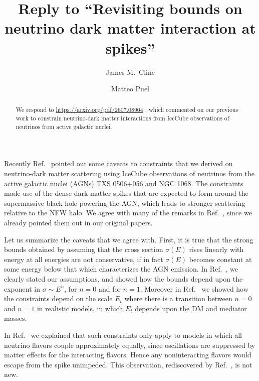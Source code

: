 \documentclass[twocolumn,prd,nofootinbib,aps,prl,floats,floatfix,amsmath,amssymb,longbibliography,secnumarabic]{revtex4-1} %
\begin{document}
\title{Reply to  ``Revisiting bounds on neutrino dark matter interaction at spikes''}
\author{James M.\ Cline}
\author{Matteo Puel}


\begin{abstract}
We respond to  \url{https://arxiv.org/pdf/2607.08904} \cite{Farzan:2026wek},
which commented on our previous work to constrain neutrino-dark matter interactions from IceCube observations of neutrinos from active galactic nuclei.


\end{abstract}

\maketitle

Recently Ref.\ \cite{Farzan:2026wek} pointed out some caveats to constraints that we derived on neutrino-dark matter scattering 
\cite{Cline:2022qld,Cline:2023tkp}
using IceCube observations of neutrinos from the active galactic nuclei
(AGNs) TXS 0506+056 and NGC 1068.  The constraints made use of the dense dark matter spikes that are expected to form around the supermassive black hole powering the AGN, which leads to stronger scattering relative to the NFW halo.    We agree with many of the remarks in Ref.\ \cite{Farzan:2026wek}, since we already pointed them out in our original papers.

Let us summarize the caveats that we agree with.  First, it is true that the strong bounds obtained by assuming that the cross section $\sigma(E)$ rises linearly with energy at all energies are not conservative, if in fact $\sigma(E)$ becomes constant at some energy below that which characterizes the AGN emission.  In 
Ref.\ \cite{Cline:2022qld}, we clearly stated our assumptions, and showed how the bounds depend upon the exponent in $\sigma \sim E^n$, for $n=0$ and for $n=1$. 
Moreover in Ref.\ \cite{Cline:2023tkp} we showed how the constraints depend on 
the scale $E_t$ where there is a transition between $n=0$ and $n=1$ in  realistic models, in which $E_t$ depends upon
the DM and mediator masses.  

In Ref.\  \cite{Cline:2023tkp} we  explained that such constraints only apply to models in which all neutrino flavors couple approximately equally, since oscillations are suppressed by matter effects for the interacting flavors.  Hence any noninteracting flavors would escape from the spike unimpeded.  This observation, rediscovered by Ref.\ \cite{Farzan:2026wek}, is not new.
\end{document}
